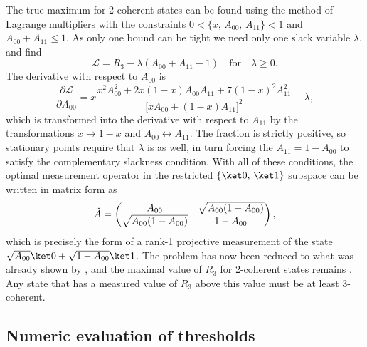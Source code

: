 The true maximum for 2-coherent states can be found using the method of Lagrange multipliers with the constraints $0 < \{x,\,A_{00},\,A_{11}\} < 1$ and $A_{00} + A_{11} \le 1$.
As only one bound can be tight we need only one slack variable $\lambda$, and find
\begin{equation}
\mathcal L = R_3 - \lambda(A_{00} + A_{11} - 1) \quad\text{for}\quad \lambda\ge0.
\end{equation}
The derivative with respect to $A_{00}$ is
\begin{equation}
\frac{\partial\mathcal L}{\partial A_{00}} =
    x\frac{x^2 A_{00}^2 + 2x(1-x)A_{00}A_{11} + 7{(1-x)}^2A_{11}^2}{{\bigl[xA_{00} + (1-x)A_{11}\bigr]}^2} - \lambda,
\end{equation}
which is transformed into the derivative with respect to $A_{11}$ by the transformations $x\to1-x$ and $A_{00}\leftrightarrow A_{11}$.
The fraction is strictly positive, so stationary points require that $\lambda$ is as well, in turn forcing the $A_{11} = 1 - A_{00}$ to satisfy the complementary slackness condition.
With all of these conditions, the optimal measurement operator in the restricted $\{\ket0,\,\ket1\}$ subspace can be written in matrix form as
\begin{equation}
\hat{A} = \begin{pmatrix}
    A_{00} & \sqrt{A_{00}(1-A_{00})} \\
    \sqrt{A_{00}(1-A_{00})} & 1 - A_{00}
\end{pmatrix},
\end{equation}
which is precisely the form of a rank-1 projective measurement of the state $\sqrt{A_{00}}\ket0 + \sqrt{1 - A_{00}}\ket1$.
The problem has now been reduced to what was already shown by \citet{Dive2020}, and the maximal value of $R_3$ for 2-coherent states remains .
Any state that has a measured value of $R_3$ above this value must be at least 3-coherent.


\subsection{Numeric evaluation of thresholds}
\label{sec:coherence-numeric-thresholds}

